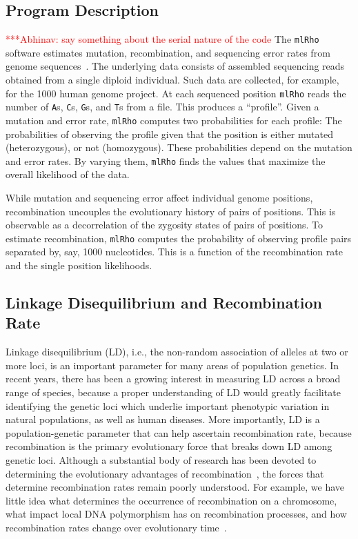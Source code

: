 \documentclass{sig-alternate}
\newcommand{\abhi}[1]{ {\textcolor{red} { ***Abhinav: #1 }}}
\newcommand{\abhi}[1]{ {}}
\newcommand{\ty}{\texttt}
\begin{document}
\subsection{Program Description}
\abhi{say something about the serial nature of the code}
The \texttt{mlRho} software estimates mutation, recombination, and sequencing error rates from genome
sequences~\cite{MEC:MEC4482}. The underlying data consists of assembled sequencing reads obtained from a
single diploid individual. Such data are collected, for example, for the 1000 human genome project. At each
sequenced position \texttt{mlRho} reads the number of \ty{A}s, \ty{C}s, \ty{G}s, and \ty{T}s from a file. This
produces a ``profile''. Given a mutation and error rate, \texttt{mlRho} computes two probabilities for each
profile: The probabilities of observing the profile given that the position is either mutated (heterozygous),
or not (homozygous). These probabilities depend on the mutation and error rates. By varying them,
\texttt{mlRho} finds the values that maximize the overall likelihood of the data.

While mutation and sequencing error affect individual genome positions, recombination uncouples the
evolutionary history of pairs of positions. This is observable as a decorrelation of the zygosity states of
pairs of positions. To estimate recombination, \texttt{mlRho} computes the probability of observing profile pairs
separated by, say, 1000 nucleotides. This is a function of the recombination rate and the single position
likelihoods.

\subsection{Linkage Disequilibrium and Recombination Rate}\label{sec:LD}
Linkage disequilibrium (LD), i.e., the non-random association of alleles at two or more loci, is an important
parameter for many areas of population genetics.  In recent years, there has been a growing interest in
measuring LD across a broad range of species, because a proper understanding of LD would greatly facilitate
identifying the genetic loci which underlie important phenotypic variation in natural populations, as well as
human diseases. More importantly, LD is a population-genetic parameter that can help ascertain recombination
rate, because recombination is the primary evolutionary force that breaks down LD among genetic loci. Although
a substantial body of research has been devoted to determining the evolutionary advantages of
recombination~\cite{resolving-paradox}, the forces that determine recombination rates remain poorly
understood. For example, we have little idea what determines the occurrence of recombination on a chromosome,
what impact local DNA polymorphism has on recombination processes, and how recombination rates change over
evolutionary time~\cite{stumpf}.
\end{document}
